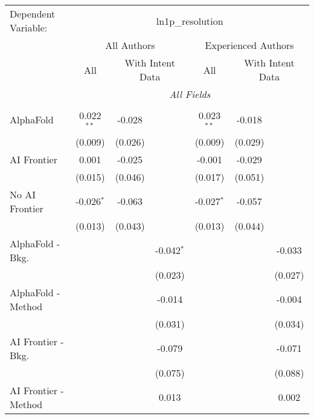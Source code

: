 \begingroup
\centering
\begin{tabular}{lcccccc}
   \tabularnewline \midrule \midrule
   Dependent Variable: & \multicolumn{6}{c}{ln1p\_resolution}\\
 & \multicolumn{3}{c}{All Authors} & \multicolumn{3}{c}{Experienced Authors} \\
\cmidrule(lr){2-4} \cmidrule(lr){5-7}
 & \multicolumn{1}{c}{All} & \multicolumn{2}{c}{With Intent Data} & \multicolumn{1}{c}{All} & \multicolumn{2}{c}{With Intent Data} \\
\cmidrule(lr){2-2} \cmidrule(lr){3-4} \cmidrule(lr){5-5} \cmidrule(lr){6-7}
 & \multicolumn{6}{c}{\textit{All Fields}} \\ \\
   AlphaFold               & 0.022$^{**}$ & -0.028  &              & 0.023$^{**}$ & -0.018  &   \\   
                           & (0.009)      & (0.026) &              & (0.009)      & (0.029) &   \\   
   AI Frontier             & 0.001        & -0.025  &              & -0.001       & -0.029  &   \\   
                           & (0.015)      & (0.046) &              & (0.017)      & (0.051) &   \\   
   No AI Frontier          & -0.026$^{*}$ & -0.063  &              & -0.027$^{*}$ & -0.057  &   \\   
                           & (0.013)      & (0.043) &              & (0.013)      & (0.044) &   \\   
   AlphaFold - Bkg.        &              &         & -0.042$^{*}$ &              &         & -0.033\\   
                           &              &         & (0.023)      &              &         & (0.027)\\   
   AlphaFold - Method      &              &         & -0.014       &              &         & -0.004\\   
                           &              &         & (0.031)      &              &         & (0.034)\\   
   AI Frontier - Bkg.      &              &         & -0.079       &              &         & -0.071\\   
                           &              &         & (0.075)      &              &         & (0.088)\\   
   AI Frontier - Method    &              &         & 0.013        &              &         & 0.002\\   

\end{tabular}
